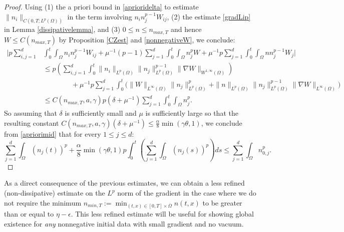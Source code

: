 \documentclass[12pt]{article}
\theoremstyle{plain}
\begin{document}
\begin{proof}
Using (1) the a priori bound in \eqref{aprioridelta} to estimate $\|n_{i}\|_{C(0, T; L^{p}(\Omega))}$ in the term involving $n_{i}n_{j}^{p - 1} W_{ij}$, (2) the estimate \eqref{gradLip} in Lemma \ref{dissipativelemma}, and (3) $0 \le n \le n_{max, T}$ and hence $W \le C(n_{max, T})$ by Proposition \ref{CZest} and \ref{nonnegativeW}, we conclude:
\begin{align*}
\Bigg|p\sum_{i, j = 1}^{d} &\int_{0}^{t} \int_{\Omega} n_{i}n_{j}^{p - 1} W_{ij} + \mu^{-1}(p - 1) \sum_{j = 1}^{d} \int_{0}^{t} \int_{\Omega} n_{j}^{p}W + \mu^{-1}p \sum_{j = 1}^{d} \int_{0}^{t} \int_{\Omega} nn^{p - 1}_{j}W_{j}\Bigg| \\
&\le p \left(\sum_{i, j = 1}^{d} \int_{0}^{t} \|n_{i}\|_{L^{p}(\Omega)} \|n_{j}\|_{L^{p}(\Omega)}^{p - 1} \|\nabla W\|_{W^{1, \infty}(\Omega)}\right) \\
&\qquad \qquad + \mu^{-1}p \sum_{j = 1}^{d} \int_{0}^{t} \Big(\|W\|_{L^{\infty}(\Omega)} \|n_{j}\|_{L^{p}(\Omega)}^{p} + \|n\|_{L^{p}(\Omega)}\|n_{j}\|_{L^{p}(\Omega)}^{p - 1} \|\nabla W\|_{L^{\infty}(\Omega)}\Big) \\
&\le C(n_{max, T}, a, \gamma) p(\delta + \mu^{-1}) \sum_{j = 1}^{d} \int_{0}^{t} \int_{\Omega} n_{j}^{p}.
\end{align*}
So assuming that $\delta$ is sufficiently small and $\mu$ is sufficiently large so that the resulting constant $\displaystyle C(n_{max, T}, a, \gamma) (\delta + \mu^{-1}) \le \frac{\alpha}{8}\min(\gamma \theta, 1)$, we conclude from \eqref{apriorimid} that for every $1 \le j \le d$:
\begin{equation*}
\sum_{j = 1}^{d} \int_{\Omega} (n_{j}(t))^{p} + \frac{\alpha}{8}\min(\gamma \theta, 1) p \int_{0}^{t} \left(\sum_{j = 1}^{d} \int_{\Omega} (n_{j}(s))^{p} \right) ds \le \sum_{j = 1}^{d} \int_{\Omega} n_{0, j}^{p}.
\end{equation*}

\end{proof}

As a direct consequence of the previous estimates, we can obtain a less refined (non-dissipative) estimate on the $L^{p}$ norm of the gradient in the case where we do not require the minimum $n_{min, T} := \min_{(t, x) \in [0, T] \times \overline{\Omega}} n(t, x)$ to be greater than or equal to $\eta - \epsilon$. This less refined estimate will be useful for showing global existence for \textit{any} nonnegative initial data with small gradient and no vacuum.
\end{document}
